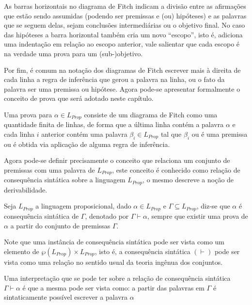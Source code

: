 As barras horizontais no diagrama de Fitch indicam a divisão entre  as  afirmações  que  estão sendo  assumidas  (podendo ser premissas e (ou) hipóteses) e as palavras que se seguem delas, sejam conclusões intermediárias ou o objetivo final. No caso das hipóteses a barra horizontal também cria um novo ``escopo'', isto é, adiciona uma indentação em relação ao escopo anterior, vale salientar que cada escopo é na verdade uma prova para um (sub-)objetivo.

Por fim, é comum na notação dos diagramas de Fitch escrever mais à direita de cada linha a regra de inferência que gerou a palavra na linha, ou o fato da palavra ser uma premissa ou hipótese. Agora pode-se apresentar formalmente o conceito de prova que será adotado neste capítulo.

\begin{definition}[Prova]\label{def:Prova}
	Uma prova para $\alpha \in L_{Prop}$ consiste de um diagrama de Fitch como uma quantidade finita de linhas, de forma que a última linha contém a palavra $\alpha$ e cada linha $i$ anterior contém uma palavra $\beta_i \in L_{Prop}$ tal que $\beta_i$ ou é uma premissa ou é obtida via aplicação de alguma regra de inferência.
\end{definition}

Agora pode-se definir precisamente o conceito que relaciona um conjunto de premissas com uma palavra de $L_{Prop}$, este conceito é conhecido como relação de consequência sintática sobre a linguagem $L_{Prop}$, o mesmo descreve a noção de derivabilidade.

\begin{definition}\label{def:ConseSintatica}
	Seja $L_{Prop}$ a linguagem proposicional, dado $\alpha \in L_{Prop}$ e $\Gamma \subseteq L_{Prop}$, diz-se que $\alpha$ é consequência sintática de $\Gamma$, denotado por $\Gamma \vdash \alpha$, sempre que existir uma prova de $\alpha$ a partir do conjunto de premissas $\Gamma$. 
\end{definition}

\begin{remark}
	Note que uma instância de consequência sintática pode ser vista como um elemento de $\wp(L_{Prop}) \times L_{Prop}$, isto é, a  consequência sintática $(\vdash)$ pode ser vista como uma relação no sentido usual da teoria ingênua dos conjuntos.
\end{remark}

\begin{note}
	Uma interpretação que se pode ter sobre a relação de consequência sintática $\Gamma \vdash \alpha$ é que a mesma pode ser vista como: a partir das palavras em $\Gamma$ é sintaticamente possível escrever a palavra $\alpha$
\end{note}

